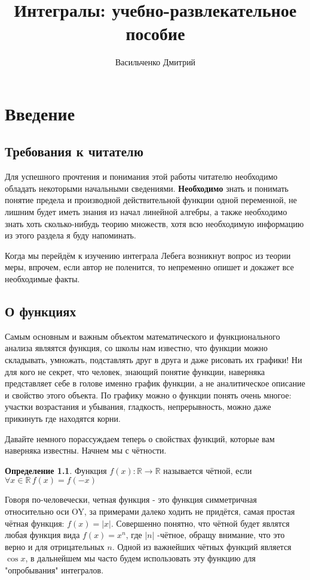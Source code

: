 \documentclass{book} %
\title{Интегралы: учебно-развлекательное пособие}
\author{Васильченко Дмитрий}
\date{} %
\theoremstyle{definition}
\newtheorem{definition}{Определение}[chapter]
\theoremstyle{remark}
\begin{document}
	
	\maketitle %
	
	\chapter{Введение}
	\section{Требования к читателю}
		\par
		Для успешного прочтения и понимания этой работы читателю необходимо обладать некоторыми начальными сведениями. \textbf{Необходимо} знать и понимать понятие предела и производной действительной функции одной переменной, не лишним будет иметь знания из начал линейной алгебры, а также необходимо знать хоть сколько-нибудь теорию множеств, хотя всю необходимую информацию из этого раздела я буду напоминать. 
		
		Когда мы перейдём к изучению интеграла Лебега возникнут вопрос из теории меры, впрочем, если автор не поленится, то непременно опишет и докажет все необходимые факты.
	\section{О функциях}
		\par
		Самым основным и важным объектом математического и функционального анализа являятся функция, со школы нам известно, что функции можно складывать, умножать, подставлять друг в друга и даже рисовать их графики! Ни для кого не секрет, что человек, знающий понятие функции, наверняка представляет себе в голове именно график функции, а не аналитическое описание и свойство этого объекта. По графику можно о функции понять очень многое: участки возрастания и убывания, гладкость, непрерывность, можно даже прикинуть где находятся корни. 
		
		Давайте немного порассуждаем теперь о свойствах функций, которые вам наверняка известны. Начнем мы с чётности.
		\begin{definition}
			Функция $f(x): \mathbb{R} \to \mathbb{R}$ называется чётной, если $\forall x \in \mathbb{R} \, f(x) = f(-x)$
		\end{definition}
		Говоря по-человечески, четная функция - это функция симметричная относительно оси OY, за примерами далеко ходить не придётся, самая простая чётная функция: $f(x) = |x|$. Совершенно понятно, что чётной будет являтся любая функция вида $f(x) = x^n$, где $|n|$ -чётное, обращу внимание, что это верно и для отрицательных $n$. Одной из важнейших чётных функций является $\cos{x}$, в дальнейшем мы часто будем использовать эту функцию для "опробывания" интегралов.
		
\end{document}

